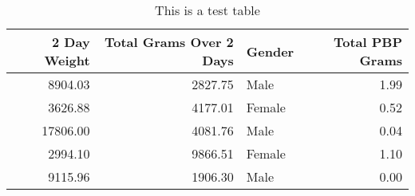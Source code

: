 \begin{table}[h]
\caption{This is a test table}
\label{test_table}
\begin{tabular}{rrlr}
\toprule
2 Day Weight & Total Grams Over 2 Days & Gender & Total PBP Grams \\
\midrule
8904.03 & 2827.75 & Male & 1.99 \\
3626.88 & 4177.01 & Female & 0.52 \\
17806.00 & 4081.76 & Male & 0.04 \\
2994.10 & 9866.51 & Female & 1.10 \\
9115.96 & 1906.30 & Male & 0.00 \\
\bottomrule
\end{tabular}
\end{table}
